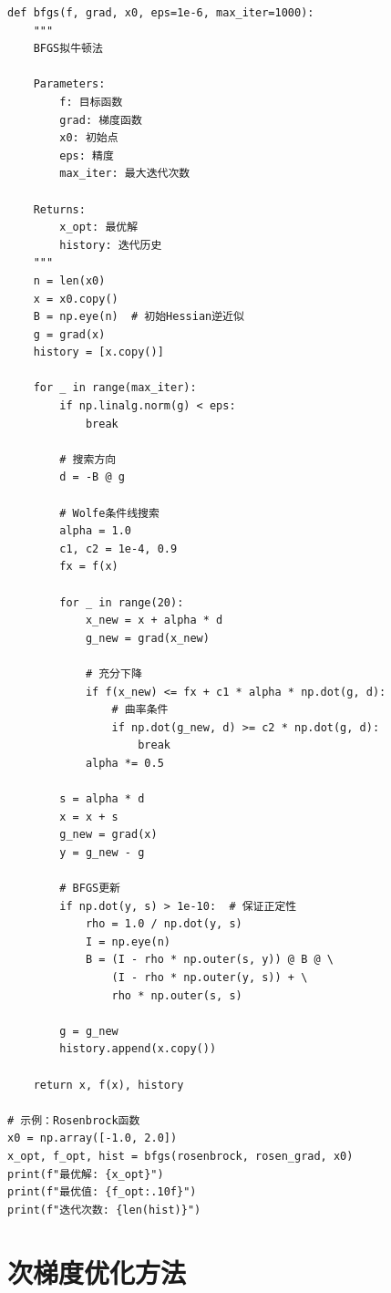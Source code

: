 \begin{codebox}[BFGS方法]
\begin{lstlisting}
def bfgs(f, grad, x0, eps=1e-6, max_iter=1000):
    """
    BFGS拟牛顿法
    
    Parameters:
        f: 目标函数
        grad: 梯度函数
        x0: 初始点
        eps: 精度
        max_iter: 最大迭代次数
    
    Returns:
        x_opt: 最优解
        history: 迭代历史
    """
    n = len(x0)
    x = x0.copy()
    B = np.eye(n)  # 初始Hessian逆近似
    g = grad(x)
    history = [x.copy()]
    
    for _ in range(max_iter):
        if np.linalg.norm(g) < eps:
            break
        
        # 搜索方向
        d = -B @ g
        
        # Wolfe条件线搜索
        alpha = 1.0
        c1, c2 = 1e-4, 0.9
        fx = f(x)
        
        for _ in range(20):
            x_new = x + alpha * d
            g_new = grad(x_new)
            
            # 充分下降
            if f(x_new) <= fx + c1 * alpha * np.dot(g, d):
                # 曲率条件
                if np.dot(g_new, d) >= c2 * np.dot(g, d):
                    break
            alpha *= 0.5
        
        s = alpha * d
        x = x + s
        g_new = grad(x)
        y = g_new - g
        
        # BFGS更新
        if np.dot(y, s) > 1e-10:  # 保证正定性
            rho = 1.0 / np.dot(y, s)
            I = np.eye(n)
            B = (I - rho * np.outer(s, y)) @ B @ \
                (I - rho * np.outer(y, s)) + \
                rho * np.outer(s, s)
        
        g = g_new
        history.append(x.copy())
    
    return x, f(x), history

# 示例：Rosenbrock函数
x0 = np.array([-1.0, 2.0])
x_opt, f_opt, hist = bfgs(rosenbrock, rosen_grad, x0)
print(f"最优解: {x_opt}")
print(f"最优值: {f_opt:.10f}")
print(f"迭代次数: {len(hist)}")
\end{lstlisting}
\end{codebox}

\section{次梯度优化方法}\label{sec:subgradient}

